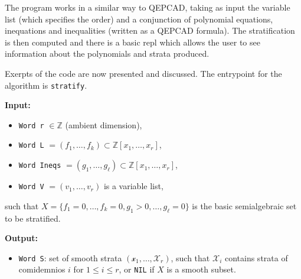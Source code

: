 \documentclass[
]{book}
\providecommand{\tightlist}{%
  \setlength{\itemsep}{0pt}\setlength{\parskip}{0pt}}
\theoremstyle{definition}
\theoremstyle{definition}
\theoremstyle{definition}
\theoremstyle{definition}
\theoremstyle{remark}
\begin{document}
The program works in a similar way to QEPCAD, taking as input the variable list (which specifies the order) and a conjunction of polynomial equations, inequations and inequalities (written as a QEPCAD formula). The stratification is then computed and there is a basic repl which allows the user to see information about the polynomials and strata produced.

Exerpts of the code are now presented and discussed. The entrypoint for the algorithm is \texttt{stratify}.

\textbf{Input:}

\begin{itemize}
\tightlist
\item
  \texttt{Word\ r} \(\in \mathbb{Z}\) (ambient dimension),
\item
  \texttt{Word\ L} \(= (f_1,\ldots,f_k) \subset \mathbb{Z}[x_1,\ldots,x_r]\),
\item
  \texttt{Word\ Ineqs} \(= (g_1,\ldots,g_\ell) \subset \mathbb{Z}[x_1,\ldots,x_r]\),
\item
  \texttt{Word\ V} \(= (v_1,\ldots,v_r)\) is a variable list,
\end{itemize}

such that \(X = \{ f_1 = 0, \ldots, f_k = 0, g_1 > 0, \ldots, g_\ell = 0 \}\) is the basic semialgebraic set to be stratified.

\textbf{Output:}

\begin{itemize}
\tightlist
\item
  \texttt{Word\ S}: set of smooth strata \((\mathcal{x}_1,\ldots,\mathcal{X}_r)\), such that \(\mathcal{X}_i\) contains strata of comidemnios \(i\) for \(1 \le i \le r\), or \texttt{NIL} if \(X\) is a smooth subset.
\end{itemize}
\end{document}
